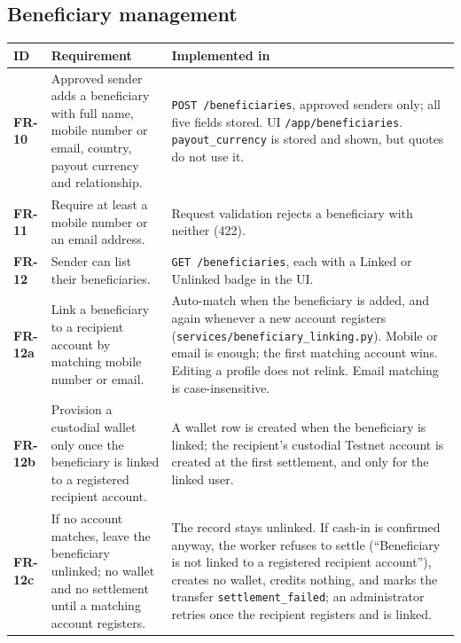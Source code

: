 \documentclass[11pt,a4paper]{article}
\makeatletter
\newcommand{\code}[1]{\texttt{\small #1}}
\newenvironment{frtable}{%
  \rowcolors{2}{white}{rowbg}
  \begin{longtable}{@{}>{\bfseries}l >{\RaggedRight\arraybackslash}p{5.5cm} >{\RaggedRight\arraybackslash}p{8.4cm}@{}}
  \toprule
  \rowcolor{headbg}\textbf{ID} & \textbf{Requirement} & \textbf{Implemented in} \\
  \midrule
  \endhead
  \bottomrule
  \endlastfoot}
 {\end{longtable}}
\makeatother
\begin{document}
\subsection{Beneficiary management}
\begin{frtable}
FR-10  & Approved sender adds a beneficiary with full name, mobile number or email, country, payout currency and relationship.
       & \code{POST /beneficiaries}, approved senders only; all five fields stored. UI \code{/app/beneficiaries}. \code{payout\_currency} is stored and shown, but quotes do not use it. \\
FR-11  & Require at least a mobile number or an email address.
       & Request validation rejects a beneficiary with neither (422). \\
FR-12  & Sender can list their beneficiaries.
       & \code{GET /beneficiaries}, each with a Linked or Unlinked badge in the UI. \\
FR-12a & Link a beneficiary to a recipient account by matching mobile number or email.
       & Auto-match when the beneficiary is added, and again whenever a new account registers (\code{services/beneficiary\_linking.py}). Mobile or email is enough; the first matching account wins. Editing a profile does not relink. Email matching is case-insensitive. \\
FR-12b & Provision a custodial wallet only once the beneficiary is linked to a registered recipient account.
       & A wallet row is created when the beneficiary is linked; the recipient's custodial Testnet account is created at the first settlement, and only for the linked user. \\
FR-12c & If no account matches, leave the beneficiary unlinked; no wallet and no settlement until a matching account registers.
       & The record stays unlinked. If cash-in is confirmed anyway, the worker refuses to settle (``Beneficiary is not linked to a registered recipient account''), creates no wallet, credits nothing, and marks the transfer \code{settlement\_failed}; an administrator retries once the recipient registers and is linked. \\
\end{frtable}
\end{document}
